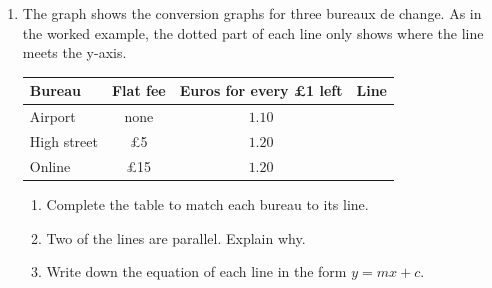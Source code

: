 \documentclass[12pt,a4paper]{article}
\begin{document}
\begin{enumerate}[resume]
\begin{enumerate}
        \vspace{5em}
\end{enumerate}

\newpage

\item The graph shows the conversion graphs for three bureaux de change. As in
the worked example, the dotted part of each line only shows where the line
meets the y-axis.
\vspace{2pt}

\begin{center}
\end{center}

\begin{center}
\begin{tabular}{|l|c|c|c|}
\hline
\textbf{Bureau} & \textbf{Flat fee} & \textbf{Euros for every \pounds1 left}
  & \textbf{Line}\\
\hline
Airport & none & $1.10$ & \\
\hline
High street & \pounds5 & $1.20$ & \\
\hline
Online & \pounds15 & $1.20$ & \\
\hline
\end{tabular}
\end{center}

\begin{enumerate}
  \item Complete the table to match each bureau to its line.
  \item Two of the lines are parallel. Explain why.

        \vspace{3.5em}
  \item Write down the equation of each line in the form $y=mx+c$.


\end{enumerate}
\end{enumerate}
\end{document}
